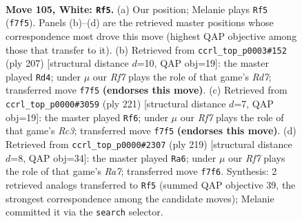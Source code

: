 \documentclass[11pt]{article}
\begin{document}
\clearpage

\begin{figure}[p]\centering
\begin{subfigure}{0.46\textwidth}\centering
\resizebox{\linewidth}{!}{%
\newchessgame
\chessboard[
  setfen={1B4k1/5R2/8/7P/8/4rp2/8/3K4 w - - 2 105},
  showmover=false,
  pgfstyle=straightmove, color=movearrow, markmove={f7-f5}
]}
\caption{}
\end{subfigure}\hfill
\begin{subfigure}{0.46\textwidth}\centering
\resizebox{\linewidth}{!}{%
\newchessgame
\chessboard[
  setfen={8/8/8/R7/P3P3/6k1/3r4/4K3 b - - 1 104},
  showmover=false,
  pgfstyle=straightmove, color=movearrow, markmove={d2-d4}
]}
\caption{}
\end{subfigure}
\\[4pt]
\begin{subfigure}{0.46\textwidth}\centering
\resizebox{\linewidth}{!}{%
\newchessgame
\chessboard[
  setfen={7k/7P/2r5/3K4/5P2/7R/8/8 b - - 26 111},
  showmover=false,
  pgfstyle=straightmove, color=movearrow, markmove={c6-f6}
]}
\caption{}
\end{subfigure}\hfill
\begin{subfigure}{0.46\textwidth}\centering
\resizebox{\linewidth}{!}{%
\newchessgame
\chessboard[
  setfen={8/P3R3/8/8/2k5/2P5/r7/1K6 b - - 12 110},
  showmover=false,
  pgfstyle=straightmove, color=movearrow, markmove={a2-a6}
]}
\caption{}
\end{subfigure}
\caption{\textbf{Move 105, White: \texttt{Rf5}.} (a) Our position; Melanie plays \texttt{Rf5} (\texttt{f7f5}). Panels (b)--(d) are the retrieved master positions whose correspondence most drove this move (highest QAP objective among those that transfer to it). (b) Retrieved from \texttt{ccrl\_top\_p0003\#152} (ply 207) [structural distance $d$=10, QAP obj=19]: the master played \texttt{Rd4}; under $\mu$ our \emph{Rf7} plays the role of that game's \emph{Rd7}; transferred move \texttt{f7f5} \textbf{(endorses this move)}. (c) Retrieved from \texttt{ccrl\_top\_p0000\#3059} (ply 221) [structural distance $d$=7, QAP obj=19]: the master played \texttt{Rf6}; under $\mu$ our \emph{Rf7} plays the role of that game's \emph{Rc3}; transferred move \texttt{f7f5} \textbf{(endorses this move)}. (d) Retrieved from \texttt{ccrl\_top\_p0000\#2307} (ply 219) [structural distance $d$=8, QAP obj=34]: the master played \texttt{Ra6}; under $\mu$ our \emph{Rf7} plays the role of that game's \emph{Ra7}; transferred move \texttt{f7f6}. Synthesis: 2 retrieved analogs transferred to \texttt{Rf5} (summed QAP objective 39, the strongest correspondence among the candidate moves); Melanie committed it via the \texttt{search} selector.}
\label{fig:thought-m208}
\end{figure}
\end{document}
